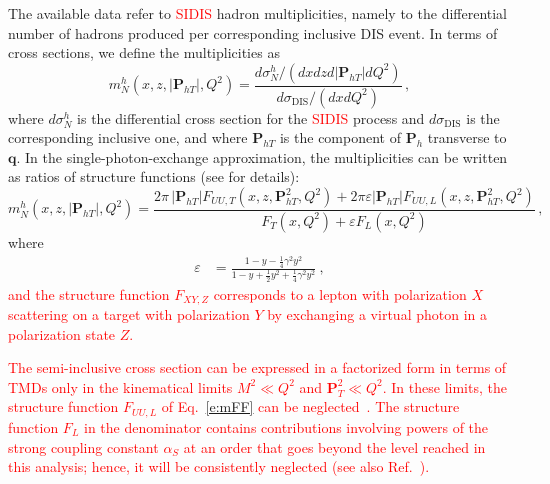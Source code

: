 \documentclass[aps,preprintnumbers,showpacs,nofootinbib,superscriptaddress,floatfix]{revtex4}
\newcommand{\Tperp}{T}
\begin{document}
The available data refer to \textcolor{red}{SIDIS} hadron multiplicities, namely to the differential number of hadrons produced per corresponding inclusive DIS event. In terms of cross sections, we define the multiplicities as
\begin{equation}
m_N^h (x,z,|\bm{P}_{h\Tperp}|, Q^2) = \frac{d \sigma_N^h / ( dx  dz d|\bm{P}_{h\Tperp}| dQ^2) }
                                                                   {d\sigma_{\text{DIS}} / ( dx dQ^2 ) }\, ,
\label{e:multiplicity}
\end{equation}
where $d\sigma_N^h$ is the differential cross section for the \textcolor{red}{SIDIS} process and $d\sigma_{\text{DIS}}$ is the corresponding inclusive one, 
and where \( \bm{P}_{h\Tperp} \) is the component of \( \bm{P}_{h} \) transverse to \( \bm{q} \). 
In the single-photon-exchange approximation, the multiplicities can be written as ratios of
structure functions (see \cite{Bacchetta:2006tn} for details):
\begin{equation}
m_N^h (x,z,|\bm{P}_{h\Tperp}|, Q^2) =   
\frac{2 \pi\,|\bm{P}_{h\Tperp}| F_{UU ,T}(x,z,\bm{P}_{h\Tperp}^2, Q^2) + 2 \pi
  \varepsilon |\bm{P}_{h\Tperp}| F_{UU ,L}(x,z,\bm{P}_{h\Tperp}^2, Q^2)}
        {F_{T}(x,Q^2) + \varepsilon  F_{L}(x,Q^2)} \, ,
 \label{e:mFF}
\end{equation} 
where
\begin{align}
\varepsilon &= \frac{1-y -\frac{1}{4} \gamma^2 y^2}{1-y+\frac{1}{2} y^2 +\frac{1}{4} \gamma^2 y^2} \ ,
\end{align}  
\textcolor{red}{and the structure function $F_{XY,Z}$ corresponds to a lepton with polarization $X$ scattering on a target with polarization $Y$ by exchanging a virtual photon in a polarization state $Z$.}

\textcolor{red}{The semi-inclusive cross section can be expressed in a factorized form in terms of TMDs only in the kinematical limits $M^2 \ll Q^2$ and $\bm{P}_T^2 \ll Q^2$. In these limits, the structure function $F_{UU,L}$ of Eq.~\eqref{e:mFF} can be neglected~\cite{Bacchetta:2008xw}. The structure function $F_L$ in the denominator contains contributions involving powers of the strong coupling constant $\alpha_S$ at an order that goes beyond the level reached in this analysis; hence, it will be consistently neglected (see also Ref.~\cite{Signori:2013mda}). }
\end{document}
